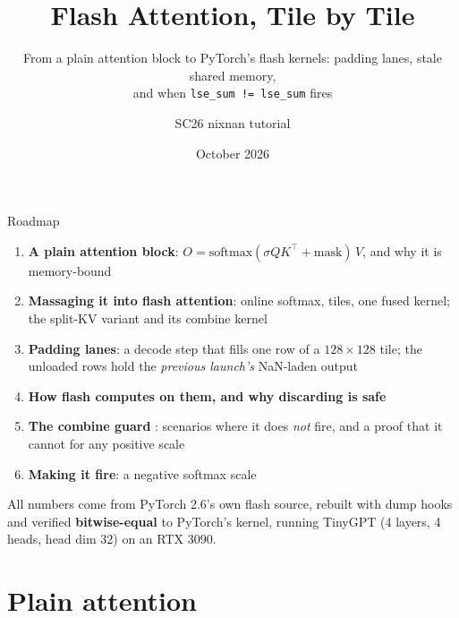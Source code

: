 \documentclass[aspectratio=169,11pt]{beamer}
\title[Flash attention, tile by tile]{Flash Attention, Tile by Tile}
\subtitle{From a plain attention block to PyTorch's flash kernels: padding lanes, stale shared memory,\\ and when \texttt{lse\_sum != lse\_sum} fires}
\author[SC26 nixnan tutorial]{SC26 nixnan tutorial}
\institute[]{\texttt{flash-attn-expt}, branch \texttt{Flash-Attn}}
\date{October 2026}
\newcommand{\code}[1]{\texttt{\detokenize{#1}}}
\newcommand{\NaN}{NaN}
\begin{document}
\begin{frame}
\titlepage
\end{frame}

\begin{frame}{Roadmap}
\begin{enumerate}
\item \textbf{A plain attention block}: $O = \mathrm{softmax}(\sigma QK^\top + \text{mask})\,V$, and why it is memory-bound
\item \textbf{Massaging it into flash attention}: online softmax, tiles, one fused kernel; the split-KV variant and its combine kernel
\item \textbf{Padding lanes}: a decode step that fills one row of a $128\times128$ tile; the unloaded rows hold the \emph{previous launch's} \NaN-laden output
\item \textbf{How flash computes on them, and why discarding is safe}
\item \textbf{The combine guard \code{lse_sum != lse_sum}}: scenarios where it does \emph{not} fire, and a proof that it cannot for any positive scale
\item \textbf{Making it fire}: a negative softmax scale
\end{enumerate}
\vspace{2mm}
\small All numbers come from PyTorch 2.6's own flash source, rebuilt with dump hooks and verified \textbf{bitwise-equal} to PyTorch's kernel, running TinyGPT (4 layers, 4 heads, head dim 32) on an RTX 3090.
\end{frame}

\section{Plain attention}
\end{document}
